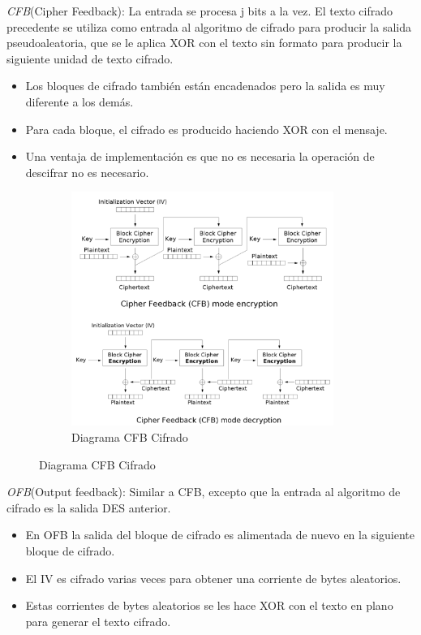 \textit{CFB}(Cipher Feedback): La entrada se procesa j bits a la vez. El texto cifrado precedente se utiliza como entrada al algoritmo de cifrado para producir la salida pseudoaleatoria, que se le aplica XOR con el texto sin formato para producir la siguiente unidad de texto cifrado.\\
\begin{itemize}
	\item Los bloques de cifrado también están encadenados pero la salida es muy diferente a los demás.
	\item Para cada bloque, el cifrado es producido haciendo XOR con el mensaje.
	\item Una ventaja de implementación es que no es necesaria la operación de descifrar no es necesario.
\end{itemize}

\begin{figure}[h]
    \centering
    \begin{subfigure}[t]{0.5\textwidth}
        \centering
        \includegraphics[height=3in]{./images/CFB.png}
        \caption{Diagrama CFB Cifrado}
        \label{fig:1-3-1}
    \end{subfigure}
\end{figure}
\pagebreak

\textit{OFB}(Output feedback): Similar a CFB, excepto que la entrada al algoritmo de cifrado es la salida DES anterior.\\
\begin{itemize}
	\item En OFB la salida del bloque de cifrado es alimentada de nuevo en la siguiente bloque de cifrado.
	\item El IV es cifrado varias veces para obtener una corriente de bytes aleatorios.
	\item Estas corrientes de bytes aleatorios se les hace XOR con el texto en plano para generar el texto cifrado.
\end{itemize}

